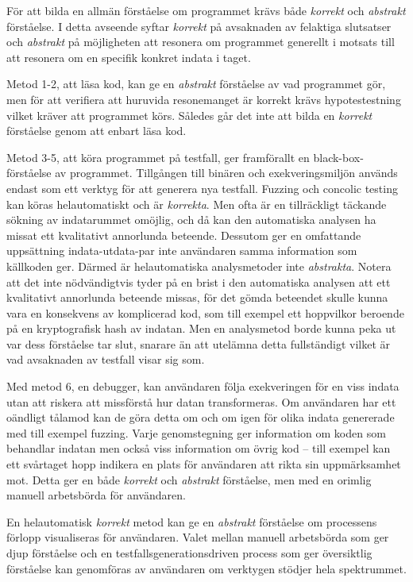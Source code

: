 För att bilda en allmän förståelse om programmet krävs både \textit{korrekt} och
\textit{abstrakt} förståelse. I detta avseende syftar \textit{korrekt} på
avsaknaden av felaktiga slutsatser och \textit{abstrakt} på möjligheten att
resonera om programmet generellt i motsats till att resonera om en specifik
konkret indata i taget.

Metod 1-2, att läsa kod, kan ge en \textit{abstrakt} förståelse av vad
programmet gör, men för att verifiera att huruvida resonemanget är korrekt krävs
hypotestestning vilket kräver att programmet körs. Således går det inte att
bilda en \textit{korrekt} förståelse genom att enbart läsa kod.

Metod 3-5, att köra programmet på testfall, ger framförallt en
black-box-förståelse av programmet. Tillgången till binären och
exekveringsmiljön används endast som ett verktyg för att generera nya testfall.
Fuzzing och concolic testing kan köras helautomatiskt och är \textit{korrekta}.
Men ofta är en tillräckligt täckande sökning av indatarummet omöjlig, och då kan
den automatiska analysen ha missat ett kvalitativt annorlunda beteende. Dessutom
ger en omfattande uppsättning indata-utdata-par inte användaren samma
information som källkoden ger. Därmed är helautomatiska analysmetoder inte
\textit{abstrakta}. Notera att det inte nödvändigtvis tyder på en brist i den
automatiska analysen att ett kvalitativt annorlunda beteende missas, för det
gömda beteendet skulle kunna vara en konsekvens av komplicerad kod, som till
exempel ett hoppvilkor beroende på en kryptografisk hash av indatan. Men en
analysmetod borde kunna peka ut var dess förståelse tar slut, snarare än att
utelämna detta fullständigt vilket är vad avsaknaden av testfall visar sig som.

Med metod 6, en debugger, kan användaren följa exekveringen för en viss indata
utan att riskera att missförstå hur datan transformeras. Om användaren har ett
oändligt tålamod kan de göra detta om och om igen för olika indata genererade
med till exempel fuzzing. Varje genomstegning ger information om koden som
behandlar indatan men också viss information om övrig kod -- till exempel kan
ett svårtaget hopp indikera en plats för användaren att rikta sin uppmärksamhet
mot. Detta ger en både \textit{korrekt} och \textit{abstrakt} förståelse, men
med en orimlig manuell arbetsbörda för användaren.

En helautomatisk \textit{korrekt} metod kan ge en \textit{abstrakt} förståelse
om processens förlopp visualiseras för användaren. Valet mellan manuell
arbetsbörda som ger djup förståelse och en testfallsgenerationsdriven process
som ger översiktlig förståelse kan genomföras av användaren om verktygen stödjer
hela spektrummet.

